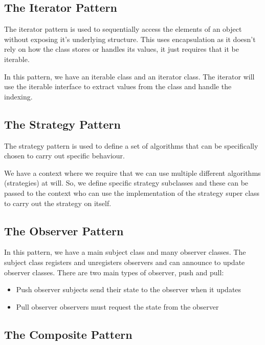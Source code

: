 \documentclass[a4paper, 12pt, twoside]{article}
\begin{document}
\subsection{The Iterator Pattern}

The iterator pattern is used to sequentially access the
elements of an object without exposing it's underlying structure.
This uses encapsulation as it doesn't rely on how the class
stores or handles its values, it just requires that it be
iterable.

\vspace{\baselineskip}

In this pattern, we have an iterable class and an iterator class.
The iterator will use the iterable interface to extract values
from the class and handle the indexing.

\newpage

\subsection{The Strategy Pattern}

The strategy pattern is used to define a set of algorithms that
can be specifically chosen to carry out specific behaviour.

\vspace{\baselineskip}

We have a context where we require that we can use multiple different
algorithms (strategies) at will. So, we define specific strategy
subclasses and these can be passed to the context who can
use the implementation of the strategy super class to carry
out the strategy on itself.

\subsection{The Observer Pattern}

In this pattern, we have a main subject class and
many observer classes. The subject class registers and
unregisters observers and can announce to update observer classes.
There are two main types of observer, push and pull:
\begin{itemize}
    \item Push observer subjects send their state to the observer when
    it updates
    \item Pull observer observers must request the state from the 
    observer    
\end{itemize}

\subsection{The Composite Pattern}
\end{document}
